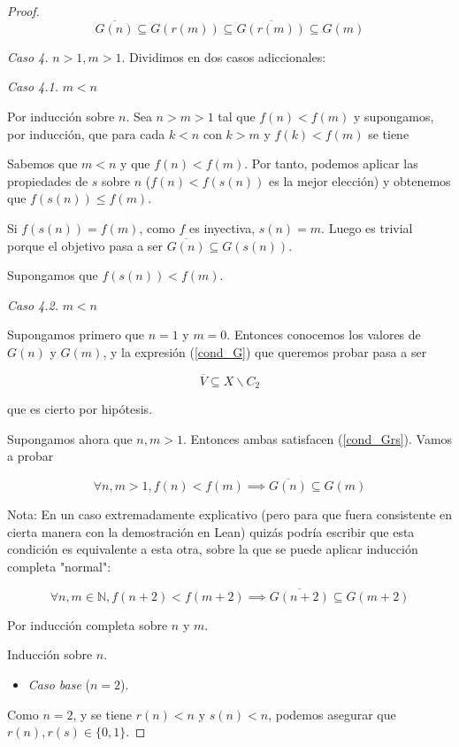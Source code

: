 \documentclass{article}
\newcommand{\nat}{\mathbb{N}}
\newcommand{\refpep}[1]{(\ref{#1})}
\begin{document}
\begin{proof}
$$ \overline{G(n)} \subseteq G(r(m)) \subseteq \overline{G(r(m))} \subseteq G(m) $$

\textit{Caso 4.} $n > 1, m > 1$. Dividimos en dos casos adiccionales:

\textit{Caso 4.1.} $m < n$

Por inducción sobre $n$. Sea $n>m>1$ tal que $f(n) < f(m)$ y supongamos, por inducción, que para cada $k < n$ con $k>m$ y $f(k) < f(m)$ se tiene 

Sabemos que $m < n$ y que $f(n) < f(m)$. Por tanto, podemos aplicar las propiedades de $s$ sobre $n$ ($f(n) < f(s(n))$ es la mejor elección) y obtenemos que $f(s(n)) \leq f(m)$.

Si $f(s(n)) = f(m)$, como $f$ es inyectiva, $s(n)=m$. Luego es trivial porque el objetivo pasa a ser $\overline{G(n)} \subseteq G(s(n))$.

Supongamos que $f(s(n)) < f(m)$.

\textit{Caso 4.2.} $m < n$


Supongamos primero que $n = 1$ y $m = 0$. Entonces conocemos los valores de $G(n)$ y $G(m)$, y la expresión \refpep{cond_G} que queremos probar pasa a ser

$$
  \overline{V} \subseteq X \backslash C_2
$$

que es cierto por hipótesis.

Supongamos ahora que $n, m >1$. Entonces ambas satisfacen \refpep{cond_Grs}. Vamos a probar

\begin{equation} \label{cond_G_inductive}
  \forall n, m > 1, f(n) < f(m) \implies \overline{G(n)} \subseteq G(m)
\end{equation}

Nota:
En un caso extremadamente explicativo (pero para que fuera consistente en cierta manera con la demostración en Lean) quizás podría escribir que esta condición es equivalente a esta otra, sobre la que se puede aplicar inducción completa "normal":

$$
  \forall n, m \in \nat, f(n+2) < f(m+2) \implies \overline{G(n+2)} \subseteq G(m+2)
$$


Por inducción completa sobre $n$ y $m$.

Inducción sobre $n$.

\begin{itemize}
  \item \textit{Caso base} ($n = 2$).
\end{itemize}
  
Como $n=2$, y se tiene $r(n) < n$ y $s(n) < n$, podemos asegurar que $r(n), r(s) \in \{0, 1\}$.


\end{proof}
\end{document}
